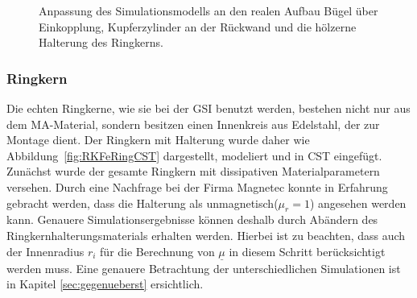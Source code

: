         
            \begin{figure}[htb]
                \centering
                \hspace{0.01\textwidth}
                \hspace{0.01\textwidth}
                \caption{Anpassung des Simulationsmodells an den realen Aufbau \protect{} Bügel über Einkopplung, \protect{} Kupferzylinder an der Rückwand und \protect{} die hölzerne Halterung des Ringkerns.}
                \label{fig:AnpassungCST}
            \end{figure}
        
        	\newpage
        
            \subsubsection{Ringkern}\label{sec:rksimulation}
            \label{sec:ringkern}
            Die echten Ringkerne, wie sie bei der GSI benutzt werden, bestehen nicht nur aus dem MA-Material, sondern besitzen einen Innenkreis aus Edelstahl, der zur Montage dient. Der Ringkern mit Halterung wurde daher wie Abbildung~\ref{fig:RKFeRingCST} dargestellt, modeliert und in CST eingefügt. Zun\"achst wurde der gesamte Ringkern mit dissipativen Materialparametern versehen. Durch eine Nachfrage bei der Firma Magnetec konnte in Erfahrung gebracht werden, dass die Halterung als unmagnetisch($\mu_r = 1$) angesehen werden kann. Genauere Simulationsergebnisse können deshalb durch Abändern des Ringkernhalterungsmaterials erhalten werden. Hierbei ist zu beachten, dass auch der Innenradius $r_i$ f\"ur die Berechnung von $\underline{\mu}$ in diesem Schritt ber\"ucksichtigt werden muss. Eine genauere Betrachtung der unterschiedlichen Simulationen ist in Kapitel \ref{sec:gegenueberst} ersichtlich.
                
